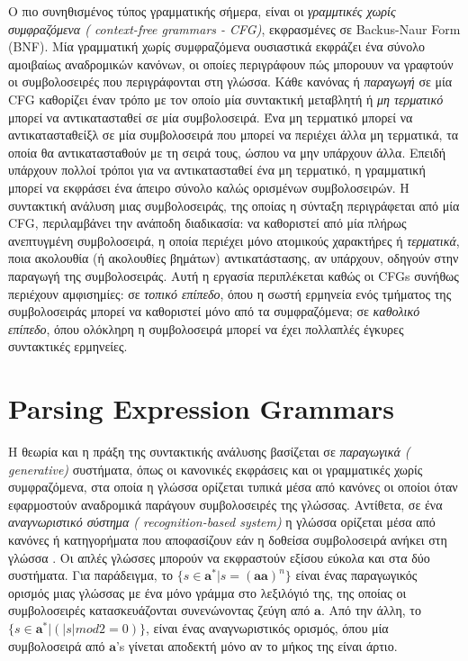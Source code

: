 \documentclass[diploma]{softlab-thesis}
\begin{document}
Ο πιο συνηθισμένος τύπος γραμματικής σήμερα, είναι οι \textit{γραμμτικές χωρίς συμφραζόμενα ( context-free grammars - CFG)}, εκφρασμένες σε  Backus-Naur Form (BNF). 
Μία γραμματική χωρίς συμφραζόμενα ουσιαστικά εκφράζει ένα σύνολο αμοιβαίως αναδρομικών κανόνων, οι οποίες περιγράφουν πώς μπορουυν να γραφτούν οι συμβολοσειρές που περιγράφονται στη γλώσσα.
Κάθε κανόνας ή \textit{ παραγωγή}  σε μία  CFG καθορίζει έναν τρόπο με τον οποίο μία συντακτική μεταβλητή ή  \textit{ μη τερματικό} μπορεί να αντικατασταθεί σε μία συμβολοσειρά. 
Ένα μη τερματικό μπορεί να αντικατασταθείξλ σε μία συμβολοσειρά που μπορεί να περιέχει άλλα μη τερματικά, τα οποία θα αντικατασταθούν με τη σειρά τους, ώσπου να μην υπάρχουν άλλα.
Επειδή υπάρχουν πολλοί τρόποι για να αντικατασταθεί ένα μη τερματικό, η γραμματική μπορεί να εκφράσει ένα άπειρο σύνολο καλώς ορισμένων συμβολοσειρών.
Η συντακτική ανάλυση μιας συμβολοσειράς, της οποίας η σύνταξη περιγράφεται από μία  CFG, περιλαμβάνει την ανάποδη διαδικασία: 
να καθοριστεί από μία πλήρως ανεπτυγμένη συμβολοσειρά, η οποία περιέχει μόνο ατομικούς χαρακτήρες ή  \textit{ τερματικά}, ποια ακολουθία (ή ακολουθίες βημάτων) αντικατάστασης, αν υπάρχουν, οδηγούν στην παραγωγή της συμβολοσειράς.
Αυτή η εργασία περιπλέκεται καθώς οι  CFGs  συνήθως περιέχουν αμφισημίες:
σε  \textit{τοπικό επίπεδο}, όπου η σωστή ερμηνεία ενός τμήματος της συμβολοσειράς μπορεί να καθοριστεί μόνο από τα συμφραζόμενα; 
σε \textit{καθολικό επίπεδο}, όπου ολόκληρη η συμβολοσειρά μπορεί να έχει πολλαπλές έγκυρες συντακτικές ερμηνείες.

\section{ Parsing Expression Grammars}
 Η θεωρία και η πράξη της συντακτικής ανάλυσης βασίζεται σε \textit{ παραγωγικά ( generative)} συστήματα, όπως οι κανονικές εκφράσεις και οι γραμματικές χωρίς συμφραζόμενα, στα οποία η γλώσσα ορίζεται τυπικά μέσα από κανόνες οι οποίοι όταν εφαρμοστούν αναδρομικά παράγουν συμβολοσειρές της γλώσσας.
Αντίθετα, σε ένα \textit{ αναγνωριστικό σύστημα ( recognition-based system)} η γλώσσα ορίζεται μέσα από κανόνες ή κατηγορήματα που αποφασίζουν εάν η δοθείσα συμβολοσειρά ανήκει στη γλώσσα \cite{ford-peg}.
Οι απλές γλώσσες μπορούν να εκφραστούν εξίσου εύκολα και στα δύο συστήματα.
 Για παράδειγμα, το $\{ s \in \mathbf{a}^* | s = {(\mathbf{a}\mathbf{a})}^n\}$ είναι ένας παραγωγικός ορισμός μιας γλώσσας με ένα μόνο γράμμα στο λεξιλόγιό της, της οποίας οι συμβολοσειρές 
 κατασκευάζονται συνενώνοντας ζεύγη από $ \mathbf{a}$.
 Από την άλλη, το $\{ s \in \mathbf{a}^* | (\lvert s \rvert mod2=0)\}$, είναι ένας αναγνωριστικός ορισμός, όπου μία συμβολοσειρά από  $\mathbf{a}$'s γίνεται αποδεκτή μόνο αν το μήκος της είναι άρτιο.
 
\end{document}
